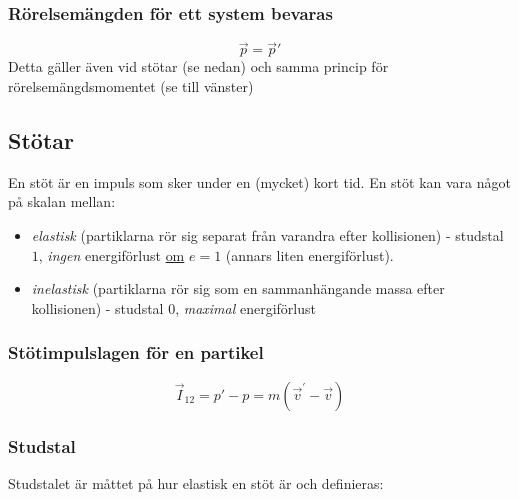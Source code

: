 \documentclass{article}
\newenvironment{ankiflashcard}[1]{}{}
\begin{document}
\begin{paracol}{2}
\begin{ankiflashcard}{Vad gäller för ett systems rörelsemängd?} 
\subsubsection{Rörelsemängden för ett system bevaras}
$$\vec p=\vec p'$$
Detta gäller även vid stötar (se nedan) och samma princip för rörelsemängdsmomentet (se till vänster)
\end{ankiflashcard}

\subsection{Stötar}
En stöt är en impuls som sker under en (mycket) kort tid. En stöt kan vara något på skalan mellan:

\begin{ankiflashcard}{Förklara de olika typerna av stötar som finns, hur energiförlusten ser ut och vad studstalet är.}
    
\begin{itemize}
    \item \textit{elastisk} (partiklarna rör sig separat från varandra efter kollisionen) - studstal $1$, \color{blue}\textit{ingen }\color{black} energiförlust \underline{om} $e=1$ (annars liten energiförlust).
    \item  \textit{inelastisk } (partiklarna rör sig som en sammanhängande massa efter kollisionen) - studstal $0$, \color{red}\textit{maximal }\color{black} energiförlust
\end{itemize}
\end{ankiflashcard}

\begin{ankiflashcard}{Formulera stötimpulslagen för en partikel}
\subsubsection{Stötimpulslagen för en partikel}
$$\vec I_{12} = p'-p=m(\vec v^{\prime} - \vec v)$$
\end{ankiflashcard}


\subsubsection{Studstal}
Studstalet är måttet på hur elastisk en stöt är och definieras:



\end{paracol}
\end{document}
